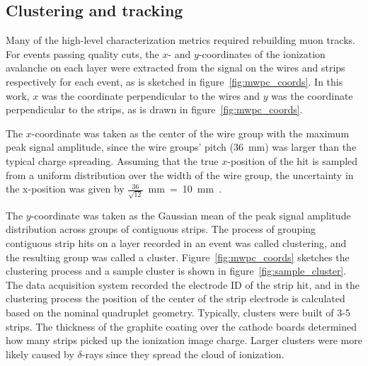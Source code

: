 \subsection{Clustering and tracking}
Many of the high-level characterization metrics required rebuilding muon tracks. For events passing quality cuts, the $x$- and $y$-coordinates of the ionization avalanche on each layer were extracted from the signal on the wires and strips respectively for each event, as is sketched in figure~\ref{fig:mwpc_coords}. In this work, $x$ was the coordinate perpendicular to the wires and $y$ was the coordinate perpendicular to the strips, as is drawn in figure~\ref{fig:mwpc_coords}.

The $x$-coordinate was taken as the center of the wire group with the maximum peak signal amplitude, since the wire groups' pitch (\SI{36}{\milli\meter}) was larger than the typical charge spreading. Assuming that the true $x$-position of the hit is sampled from a uniform distribution over the width of the wire group, the uncertainty in the x-position was given by $\frac{36}{\sqrt{12}}$~mm~=~10~mm~\cite{Sauli:117989}.

The $y$-coordinate was taken as the Gaussian mean of the peak signal amplitude distribution across groups of contiguous strips. The process of grouping contiguous strip hits on a layer recorded in an event was called clustering, and the resulting group was called a cluster. Figure~\ref{fig:mwpc_coords} sketches the clustering process and a sample cluster is shown in figure~\ref{fig:sample_cluster}. The data acquisition system recorded the electrode ID of the strip hit, and in the clustering process the position of the center of the strip electrode is calculated based on the nominal quadruplet geometry. Typically, clusters were built of 3-5 strips. The thickness of the graphite coating over the cathode boards determined how many strips picked up the ionization image charge. Larger clusters were more likely caused by $\delta$-rays since they spread the cloud of ionization. 

